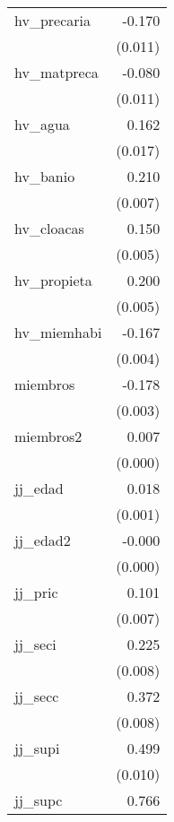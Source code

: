 {\begin{longtable}{l*{1}{D{.}{.}{-1}}}
hv\_precaria &      -0.170\sym{***}\\
            &     (0.011)         \\
\addlinespace
hv\_matpreca &      -0.080\sym{***}\\
            &     (0.011)         \\
\addlinespace
hv\_agua     &       0.162\sym{***}\\
            &     (0.017)         \\
\addlinespace
hv\_banio    &       0.210\sym{***}\\
            &     (0.007)         \\
\addlinespace
hv\_cloacas  &       0.150\sym{***}\\
            &     (0.005)         \\
\addlinespace
hv\_propieta &       0.200\sym{***}\\
            &     (0.005)         \\
\addlinespace
hv\_miemhabi &      -0.167\sym{***}\\
            &     (0.004)         \\
\addlinespace
miembros    &      -0.178\sym{***}\\
            &     (0.003)         \\
\addlinespace
miembros2   &       0.007\sym{***}\\
            &     (0.000)         \\
\addlinespace
jj\_edad     &       0.018\sym{***}\\
            &     (0.001)         \\
\addlinespace
jj\_edad2    &      -0.000\sym{***}\\
            &     (0.000)         \\
\addlinespace
jj\_pric     &       0.101\sym{***}\\
            &     (0.007)         \\
\addlinespace
jj\_seci     &       0.225\sym{***}\\
            &     (0.008)         \\
\addlinespace
jj\_secc     &       0.372\sym{***}\\
            &     (0.008)         \\
\addlinespace
jj\_supi     &       0.499\sym{***}\\
            &     (0.010)         \\
\addlinespace
jj\_supc     &       0.766\sym{***}\\

\end{longtable}}
